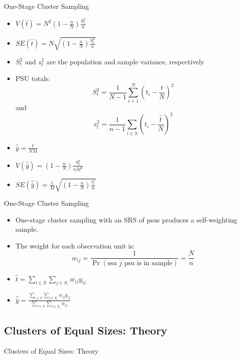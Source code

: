 \documentclass[10pt]{beamer}\usepackage[]{graphicx}\usepackage[]{xcolor}
\begin{document}
\begin{frame}{One-Stage Cluster Sampling}
\small
\begin{itemize}
\item $V(\hat{t})=N^2 \left(1-\frac{n}{N}\right) \frac{S_t^2}{n}$
\item $SE(\hat{t}) = N\sqrt{ \left(1-\frac{n}{N}\right) \frac{S_t^2}{n}}$
\item $S_t^2$ and $s_t^2$ are the population and sample variance, respectively
\item PSU totals: $$S_t^2 = \frac{1}{N-1} \sum_{i=1}^N \left(t_i-\frac{t}{N}\right)^2$$
and
$$s_t^2 = \frac{1}{n-1} \sum_{i \in S} \left(t_i-\frac{\hat{t}}{N}\right)^2 $$ 
\item $\hat{\bar{y}} = \frac{\hat{t}}{NM}$
\item $V(\hat{\bar{y}}) = \left( 1-\frac{n}{N} \right)\frac{S_t^2}{nM^2}$
\item $SE(\hat{\bar{y}}) = \frac{1}{M}\sqrt{\left(1-\frac{n}{N}\right)\frac{s_t^2}{n}}$
\end{itemize}
\end{frame}


\begin{frame}{One-Stage Cluster Sampling}

\begin{block}{}
\begin{itemize}
\item One-stage cluster sampling with an SRS of psus produces a self-weighting sample.
\item The weight for each observation unit is:
$$w_{ij} = \frac{1}{\Pr(\textrm{ssu $j$ psu is in sample})}=\frac{N}{n}$$
\item $\hat{t} = \sum_{i \in S} \sum_{j \in S_i} w_{ij} y_{ij}$
\item $\hat{\bar{y}} = \frac{\sum_{i \in S} \sum_{j \in S_i} w_{ij} y_{ij}}{\sum_{i \in S} \sum_{j \in S_i} w_{ij}}$
\end{itemize}
\end{block}

\end{frame}

\subsection{Clusters of Equal Sizes: Theory}

\begin{frame}{}
\begin{block}{}
Clusters of Equal Sizes: Theory
\end{block}
\end{frame}
\end{document}
